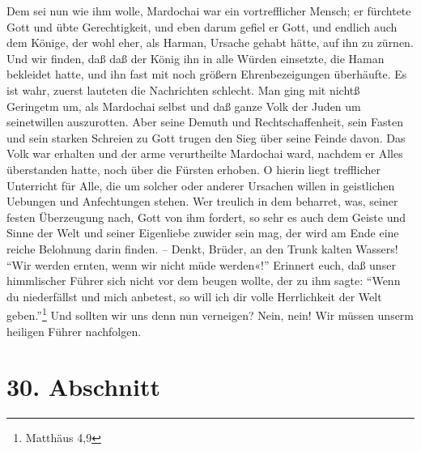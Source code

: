 Dem sei nun wie ihm wolle, Mardochai war ein vortrefflicher Mensch; er fürchtete
Gott und übte Gerechtigkeit, und eben darum gefiel er Gott, und endlich auch dem
Könige, der wohl eher, als Harman, Ursache gehabt hätte, auf ihn zu zürnen. Und
wir finden, daß daß der König ihn in alle Würden einsetzte, die Haman bekleidet
hatte, und ihn fast mit noch größern Ehrenbezeigungen überhäufte. Es ist wahr,
zuerst lauteten die Nachrichten schlecht. Man ging mit nichtß Geringetm um, als
Mardochai selbst und daß ganze Volk der Juden um seinetwillen auszurotten. Aber
seine Demuth und Rechtschaffenheit, sein Fasten und sein starken Schreien zu
Gott trugen den Sieg über seine Feinde davon. Das Volk war erhalten und der arme
verurtheilte Mardochai ward, nachdem er Alles überstanden hatte, noch über die
Fürsten erhoben. O hierin liegt trefflicher Unterricht für Alle, die um solcher
oder anderer Ursachen willen in geistlichen Uebungen und Anfechtungen stehen.
Wer treulich in dem beharret, was, seiner festen Überzeugung nach, Gott von ihm
fordert, so sehr es auch dem Geiste und Sinne der Welt und seiner Eigenliebe
zuwider sein mag, der wird am Ende eine reiche Belohnung darin finden. -- Denkt,
Brüder, an den Trunk kalten Wassers! "`Wir werden ernten, wenn wir nicht müde
werden«!"' Erinnert euch, daß unser himmlischer Führer sich nicht vor dem beugen
wollte, der zu ihm sagte: "`Wenn du niederfällst und mich anbetest, so will ich
dir volle Herrlichkeit der Welt geben."'\footnote{Matthäus 4,9} Und sollten wir
uns denn nun verneigen? Nein, nein! Wir müssen unserm heiligen Führer
nachfolgen.

\section{30. Abschnitt} \label{kap9_ab30}

